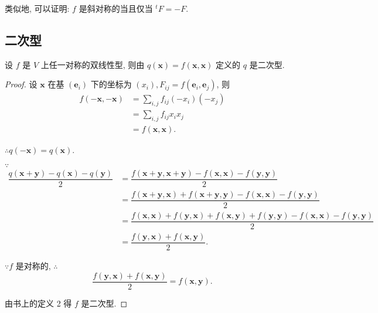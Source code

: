 \documentclass[color=black,device=normal,lang=cn,mode=geye]{elegantnote}
\begin{document}
类似地, 可以证明: $f$ 是斜对称的当且仅当 $^tF=-F$.
\subsection{二次型}
\begin{theorem}
    设 $f$ 是 $V$ 上任一对称的双线性型, 则由 $q(\boldsymbol{x})=f(\boldsymbol{x},\boldsymbol{x})$ 定义的 $q$ 是二次型.
\end{theorem}
\begin{proof}
    设 $\boldsymbol{x}$ 在基 $(\boldsymbol{e}_i)$ 下的坐标为 $(x_i),F_{ij}=f(\boldsymbol{e}_i,\boldsymbol{e}_j)$, 则
    \begin{align*}
        f(-\boldsymbol{x},-\boldsymbol{x}) & =\sum\limits_{i,j}f_{ij}(-x_i)(-x_j) \\
        & =\sum\limits_{i,j}f_{ij}x_ix_j \\
        & =f(\boldsymbol{x},\boldsymbol{x}).
    \end{align*}
   
    $\therefore q(-\boldsymbol{x})=q(\boldsymbol{x})$.

    $\because$
    \begin{align*}
        \dfrac{q(\boldsymbol{x}+\boldsymbol{y})-q(\boldsymbol{x})-q(\boldsymbol{y})}{2} & =\dfrac{f(\boldsymbol{x}+\boldsymbol{y},\boldsymbol{x}+\boldsymbol{y})-f(\boldsymbol{x},\boldsymbol{x})-f(\boldsymbol{y},\boldsymbol{y})}{2} \\
        & =\dfrac{f(\boldsymbol{x}+\boldsymbol{y},\boldsymbol{x})+f(\boldsymbol{x}+\boldsymbol{y},\boldsymbol{y})-f(\boldsymbol{x},\boldsymbol{x})-f(\boldsymbol{y},\boldsymbol{y})}{2} \\
        & =\dfrac{f(\boldsymbol{x},\boldsymbol{x})+f(\boldsymbol{y},\boldsymbol{x})+f(\boldsymbol{x},\boldsymbol{y})+f(\boldsymbol{y},\boldsymbol{y})-f(\boldsymbol{x},\boldsymbol{x})-f(\boldsymbol{y},\boldsymbol{y})}{2} \\
        & =\dfrac{f(\boldsymbol{y},\boldsymbol{x})+f(\boldsymbol{x},\boldsymbol{y})}{2}.
    \end{align*}

    $\because f$ 是对称的, $\therefore$
    \[\dfrac{f(\boldsymbol{y},\boldsymbol{x})+f(\boldsymbol{x},\boldsymbol{y})}{2}=f(\boldsymbol{x},\boldsymbol{y}).\]

    由书上的定义 2 得 $f$ 是二次型.
\end{proof}
\end{document}
